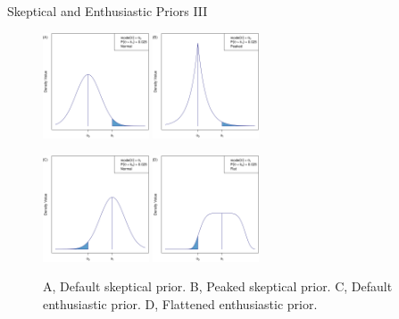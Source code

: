 \documentclass{beamer}
\begin{document}
\begin{frame}{Skeptical and Enthusiastic Priors III}
\begin{figure}[htbp]
\begin{center}
\vspace{-0.2cm}

\includegraphics[width=0.28\textwidth]{./figures/figure1a.png}
\includegraphics[width=0.28\textwidth]{./figures/figure1b.png}

\includegraphics[width=0.28\textwidth]{./figures/figure1c.png}
\includegraphics[width=0.28\textwidth]{./figures/figure1d.png}
\caption{A, Default skeptical prior.    B, Peaked skeptical prior.
         C, Default enthusiastic prior. D, Flattened enthusiastic prior.}

\label{fig:figure1}
\end{center}
\end{figure}
	
\end{frame}
\end{document}
